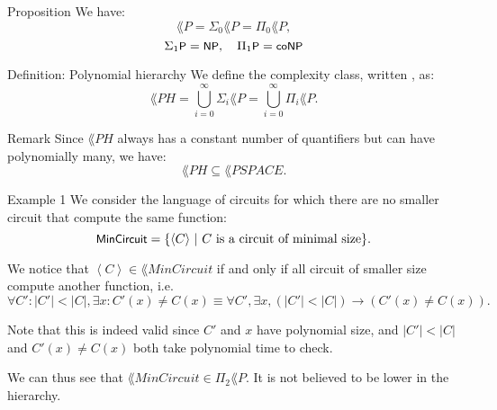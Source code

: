 \documentclass[a4paper]{article}
\begin{document}
\begin{parag}{Proposition}
    We have: 
    \[\lang{P} = \Sigma_0 \lang{P} = \Pi_0 \lang{P},\] 
    \[\Sigma_1 \lang{P} = \lang{NP}, \mathspace \Pi_1 \lang{P} = \lang{coNP}\]
\end{parag}

\begin{parag}{Definition: Polynomial hierarchy}
    We define the  complexity class, written , as: 
    \[\lang{PH} = \bigcup_{i=0}^{\infty} \Sigma_i \lang{P} = \bigcup_{i=0}^{\infty}  \Pi_i \lang{P}.\]

    \begin{subparag}{Remark}
        Since $\lang{PH}$ always has a constant number of quantifiers but  can have polynomially many, we have: 
        \[\lang{PH} \subseteq \lang{PSPACE}.\]
    \end{subparag}
\end{parag}

\begin{parag}{Example 1}
    We consider the language of circuits for which there are no smaller circuit that compute the same function: 
    \[\lang{MinCircuit} = \left\{\left\langle C \right\rangle \suchthat \text{$C$ is a circuit of minimal size}\right\}.\]

    We notice that $\left\langle C \right\rangle \in \lang{MinCircuit}$ if and only if all circuit of smaller size compute another function, i.e. 
    \[\forall C': \left|C'\right| < \left|C\right|, \exists x: C'\left(x\right) \neq C\left(x\right) \equiv \forall C', \exists x, \left(\left|C'\right| < \left|C\right|\right) \to \left(C'\left(x\right) \neq C\left(x\right)\right).\]

    Note that this is indeed valid since $C'$ and $x$ have polynomial size, and $\left|C'\right| < \left|C\right|$ and $C'\left(x\right) \neq C\left(x\right)$ both take polynomial time to check. 

    We can thus see that $\lang{MinCircuit} \in \Pi_2 \lang{P}$. It is not believed to be lower in the hierarchy.
\end{parag}
\end{document}
